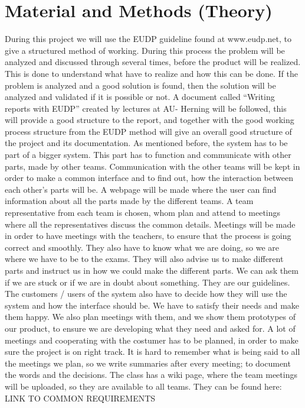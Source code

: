 \chapter{Material and Methods (Theory)}
During this project we will use the EUDP guideline found at www.eudp.net, to give a structured method of working. During this process the problem will be analyzed and discussed through several times, before the product will be realized. This is done to understand what have to realize and how this can be done. If the problem is analyzed and a good solution is found, then the solution will be analyzed and validated if it is possible or not.
A document called “Writing reports with EUDP” created by lectures at AU- Herning will be followed, this will provide a good structure to the report, and together with the good working process structure from the EUDP method will give an overall good structure of the project and its documentation.
As mentioned before, the system has to be part of a bigger system. This part has to function and communicate with other parts, made by other teams. Communication with the other teams will be kept in order to make a common interface and to find out, how the interaction between each other’s parts will be. A webpage will be made where the user can find information about all the parts made by the different teams. A team representative from each team is chosen, whom plan and attend to meetings where all the representatives discuss the common details. Meetings will be made in order to have meetings with the teachers, to ensure that the process is going correct and smoothly. They also have to know what we are doing, so we are where we have to be to the exams. They will also advise us to make different parts and instruct us in how we could make the different parts. We can ask them if we are stuck or if we are in doubt about something. They are our guidelines.
The customers / users of the system also have to decide how they will use the system and how the interface should be. We have to satisfy their needs and make them happy. We also plan meetings with them, and we show them prototypes of our product, to ensure we are developing what they need and asked for. A lot of meetings and cooperating with the costumer has to be planned, in order to make sure the project is on right track.
It is hard to remember what is being said to all the meetings we plan, so we write summaries after every meeting; to document the words and the decisions. The class has a wiki page, where the team meetings will be uploaded, so they are available to all teams. They can be found here: LINK TO COMMON REQUIREMENTS